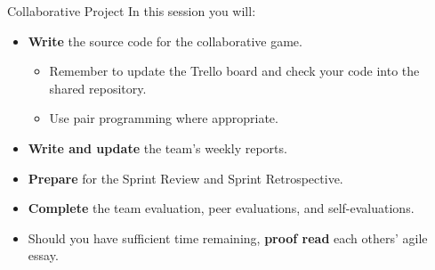 \documentclass[xcolor={dvipsnames}]{beamer}\usepackage{etoolbox}\newtoggle{printable}\togglefalse{printable}
\begin{document}
\begin{frame}{Collaborative Project}
	In this session you will:
	
	\begin{itemize}
		\item \textbf{Write} the source code for the collaborative game.
		\begin{itemize}
			\item Remember to update the Trello board and check your code into the shared repository.
			\item Use pair programming where appropriate.
		\end{itemize}
		\item \textbf{Write and update} the team's weekly reports.
		\item\textbf{Prepare} for the Sprint Review and Sprint Retrospective.
		\item \textbf{Complete} the team evaluation, peer evaluations, and self-evaluations.
		\vspace{2ex}
		\item Should you have sufficient time remaining, \textbf{proof read} each others' agile essay.
	\end{itemize}
\end{frame}	


%
\end{document}
